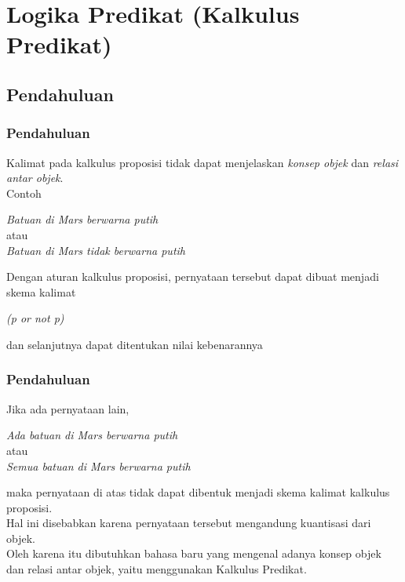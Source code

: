 \documentclass[handout]{beamer}
\theoremstyle{definition}
\theoremstyle{example}
\begin{document}
\section{Logika Predikat (Kalkulus Predikat)}
\subsection{Pendahuluan}
\begin{frame}
\frametitle{Pendahuluan}

Kalimat pada kalkulus proposisi tidak dapat menjelaskan \textit{konsep objek} dan \textit{relasi antar objek}.\\
Contoh
\begin{center}
	\color{blue}
	\textit{Batuan di Mars berwarna putih}\\
atau\\
\textit{Batuan di Mars tidak berwarna putih}\\
\end{center}
Dengan aturan kalkulus proposisi, pernyataan tersebut dapat dibuat menjadi skema kalimat\\
\begin{center}
	\textit{(p or not p)}\\
\end{center}
dan selanjutnya dapat ditentukan nilai kebenarannya

\end{frame}

\begin{frame}
	\frametitle{Pendahuluan}	
	Jika ada pernyataan lain,\\
	\begin{center}
	\color{blue}	
		\textit{ Ada batuan di Mars berwarna putih}\\
	atau\\
	\textit{Semua batuan di Mars berwarna putih}\\
	\end{center}
	maka pernyataan di atas tidak dapat dibentuk menjadi skema kalimat kalkulus	proposisi.\\
	Hal ini disebabkan karena pernyataan tersebut mengandung {\color{blue} kuantisasi dari objek}.\\
	Oleh karena itu dibutuhkan bahasa baru yang mengenal adanya konsep objek dan relasi antar objek, yaitu menggunakan {\color{blue} Kalkulus Predikat}.	
\end{frame}
\end{document}
